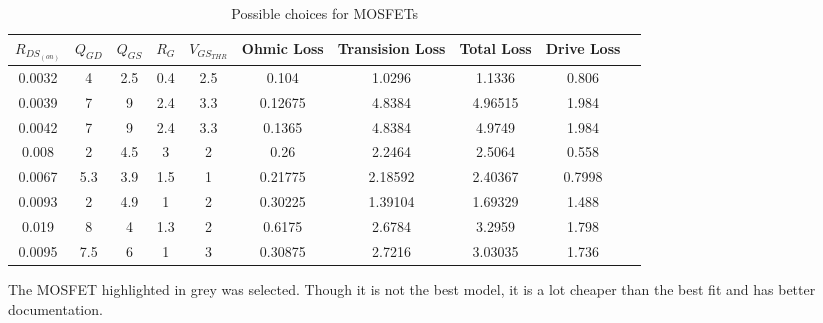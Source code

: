 \begin{table}[th!]
    \begin{center}
        \caption{Possible choices for MOSFETs}
        \label{tab:circuit:buck:mosfet}
        \begin{tabular}{cccccccccc}
            \toprule
            $R_{DS_{(on)}}$ & $Q_{GD}$ & $Q_{GS}$ & $R_G$ & $V_{GS_{THR}}$ & Ohmic Loss & Transision Loss & Total Loss & Drive Loss \\
            \midrule
            0.0032          & 4        & 2.5      & 0.4   & 2.5            & 0.104      & 1.0296          & 1.1336     & 0.806 \\
            0.0039          & 7        & 9        & 2.4   & 3.3            & 0.12675    & 4.8384          & 4.96515    & 1.984 \\
            0.0042          & 7        & 9        & 2.4   & 3.3            & 0.1365     & 4.8384          & 4.9749     & 1.984 \\
            0.008           & 2        & 4.5      & 3     & 2              & 0.26       & 2.2464          & 2.5064     & 0.558 \\
            0.0067          & 5.3      & 3.9      & 1.5   & 1              & 0.21775    & 2.18592         & 2.40367    & 0.7998 \\
            \rowcolor{lightgray}
            0.0093          & 2        & 4.9      & 1     & 2              & 0.30225    & 1.39104         & 1.69329    & 1.488 \\
            0.019           & 8        & 4        & 1.3   & 2              & 0.6175     & 2.6784          & 3.2959     & 1.798 \\
            0.0095          & 7.5      & 6        & 1     & 3              & 0.30875    & 2.7216          & 3.03035    & 1.736 \\
            \bottomrule
        \end{tabular}
    \end{center}
\end{table}

The MOSFET highlighted in grey was selected.  Though it is not the best model,
it is a lot cheaper than the best fit and has better documentation.
